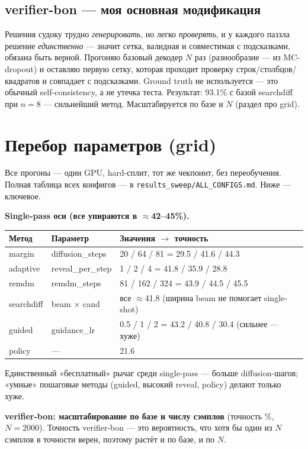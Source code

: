 \documentclass[11pt]{article}
\newcommand{\code}[1]{\texttt{#1}}
\begin{document}
\subsection{verifier-bon — моя основная модификация}
Решения судоку трудно \emph{генерировать}, но легко \emph{проверять}, и у каждого паззла решение
\emph{единственно} — значит сетка, валидная и совместимая с подсказками, обязана быть верной. Прогоняю
базовый декодер $N$ раз (разнообразие — из MC-dropout) и оставляю первую сетку, которая проходит проверку
строк/столбцов/квадратов и совпадает с подсказками. Ground truth не используется — это обычный
self-consistency, а не утечка теста. Результат: 93.1\% с базой searchdiff при $n{=}8$ — сильнейший метод.
Масштабируется по базе и $N$ (раздел про grid).

\section{Перебор параметров (grid)}

Все прогоны — один GPU, hard-сплит, тот же чекпоинт, без переобучения. Полная таблица всех конфигов — в
\code{results_sweep/ALL_CONFIGS.md}. Ниже — ключевое.

\textbf{Single-pass оси (все упираются в $\approx$42–45\%).}

\begin{center}
\begin{tabular}{@{}lll@{}}
\toprule
Метод & Параметр & Значения $\to$ точность \\
\midrule
margin & diffusion\_steps & 20 / 64 / 81 = 29.5 / 41.6 / 44.3 \\
adaptive & reveal\_per\_step & 1 / 2 / 4 = 41.8 / 35.9 / 28.8 \\
remdm & remdm\_steps & 81 / 162 / 324 = 43.9 / 44.5 / 45.5 \\
searchdiff & beam × cand & все $\approx$41.8 (ширина beam не помогает single-shot) \\
guided & guidance\_lr & 0.5 / 1 / 2 = 43.2 / 40.8 / 30.4 (сильнее — хуже) \\
policy & — & 21.6 \\
\bottomrule
\end{tabular}
\end{center}

Единственный «бесплатный» рычаг среди single-pass — больше diffusion-шагов; «умные» пошаговые методы
(guided, высокий reveal, policy) делают только хуже.

\textbf{verifier-bon: масштабирование по базе и числу сэмплов} (точность \%, $N{=}2000$). Точность
verifier-bon — это вероятность, что хотя бы один из $N$ сэмплов в точности верен, поэтому растёт и по базе, и
по $N$.
\end{document}
